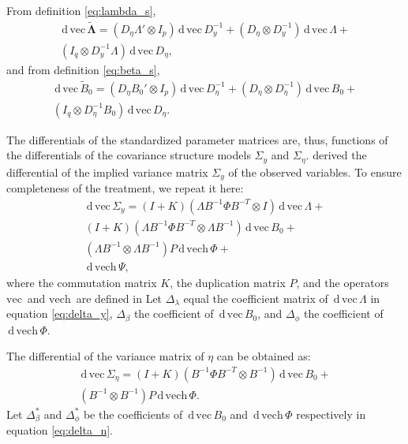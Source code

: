 \documentclass[a4paper, 11pt]{article}
\newcommand{\n}{\eta}
\renewcommand{\l}{\lambda}
\renewcommand{\b}{\beta}
\newcommand{\p}{\phi}
\renewcommand{\d}{\,\mathrm{d}\,}
\newcommand{\kronprod}{\otimes}
\renewcommand{\vec}{\mathrm{vec}\,}
\newcommand{\vech}{\mathrm{vech}\,}
\newcommand{\Lambdastan}{\boldsymbol{\tilde{\Lambda}}}
\newcommand{\Bstan}{\tilde{B}}
\newcommand{\0}{\boldsymbol{0}}
\begin{document}
From definition \ref{eq:lambda_s}, 
\begin{multline}\label{eq:dveclam}
\d\vec\Lambdastan = 
    (D_\n \Lambda' \kronprod I_p) \d \vec D_y^{-1} + 
    (D_\n \kronprod D_y^{-1}) \d\vec\Lambda + \\
    (I_q \kronprod D_y^{-1} \Lambda) \d\vec D_\n,
\end{multline}
and from definition \ref{eq:beta_s}, 
\begin{multline}\label{eq:dvecbeta}
\d\vec \Bstan_0 = 
    (D_\n B_0' \kronprod I_p) \d \vec D_\n^{-1} + 
    (D_\n \kronprod D_\n^{-1}) \d\vec B_0 + \\
    (I_q \kronprod D_\n^{-1} B_0) \d\vec D_\n.
\end{multline}

The differentials of the standardized parameter matrices are, thus, 
functions of the differentials of the covariance structure models $\Sigma_y$
and
$\Sigma_\n$.
\cite{neudecker1991linear} derived the differential of the implied variance
matrix $\Sigma_y$ of the observed variables. To ensure completeness of the treatment, we repeat it here:
\begin{equation}\label{eq:delta_y}
\begin{split}
\d\vec \Sigma_y = (I + K) (\Lambda B^{-1} \Phi B^{-T} \kronprod I) 
\d\vec\Lambda 
+ \\
(I + K) (\Lambda B^{-1} \Phi B^{-T} \kronprod \Lambda B^{-1}) \d\vec B_0
+ \\
(\Lambda B^{-1} \kronprod \Lambda B^{-1}) P \d \vech \Phi
+ \\
\d \vech \Psi,
\end{split}
\end{equation}
where the commutation matrix $K$, the duplication matrix $P$, and the operators
$\vec$ and $\vech$ are defined in \cite{magnus1988matrix}
Let $\Delta_\l$ equal the coefficient matrix
 of $\d\vec\Lambda$ in equation \ref{eq:delta_y}, 
$\Delta_\b$ the coefficient  of $\d\vec B_0$, and
$\Delta_\p$ the coefficient  of $\d\vech\Phi$.


The differential of the variance matrix of $\n$ can be obtained as:
\begin{equation}\label{eq:delta_n}
\begin{split}
\d\vec \Sigma_\n = 
(I + K) (B^{-1} \Phi B^{-T} \kronprod  B^{-1}) \d\vec B_0
+ \\
(B^{-1} \kronprod  B^{-1}) P \d \vech \Phi.
\end{split}
\end{equation}
Let $\Delta^*_\b$ and $\Delta^*_\p$  be the coefficients of $\d\vec B_0$ and
$\d\vech\Phi$ respectively in equation \ref{eq:delta_n}.
\end{document}
